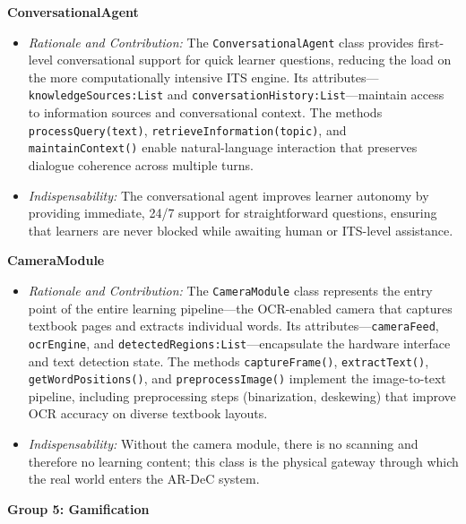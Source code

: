 \medskip
\textbf{ConversationalAgent}
\begin{itemize}
\item \textit{Rationale and Contribution:} The \texttt{ConversationalAgent} class provides first-level conversational support for quick learner questions, reducing the load on the more computationally intensive ITS engine. Its attributes---\texttt{knowledgeSources:List} and \texttt{conversationHistory:List}---maintain access to information sources and conversational context. The methods \texttt{processQuery(text)}, \texttt{retrieveInformation(topic)}, and \texttt{maintainContext()} enable natural-language interaction that preserves dialogue coherence across multiple turns.
\item \textit{Indispensability:} The conversational agent improves learner autonomy by providing immediate, 24/7 support for straightforward questions, ensuring that learners are never blocked while awaiting human or ITS-level assistance.
\end{itemize}

\medskip
\textbf{CameraModule}
\begin{itemize}
\item \textit{Rationale and Contribution:} The \texttt{CameraModule} class represents the entry point of the entire learning pipeline---the OCR-enabled camera that captures textbook pages and extracts individual words. Its attributes---\texttt{cameraFeed}, \texttt{ocrEngine}, and \texttt{detectedRegions:List}---encapsulate the hardware interface and text detection state. The methods \texttt{captureFrame()}, \texttt{extractText()}, \texttt{getWordPositions()}, and \texttt{preprocessImage()} implement the image-to-text pipeline, including preprocessing steps (binarization, deskewing) that improve OCR accuracy on diverse textbook layouts.
\item \textit{Indispensability:} Without the camera module, there is no scanning and therefore no learning content; this class is the physical gateway through which the real world enters the AR-DeC system.
\end{itemize}

\bigskip
\noindent\textbf{Group 5: Gamification}


